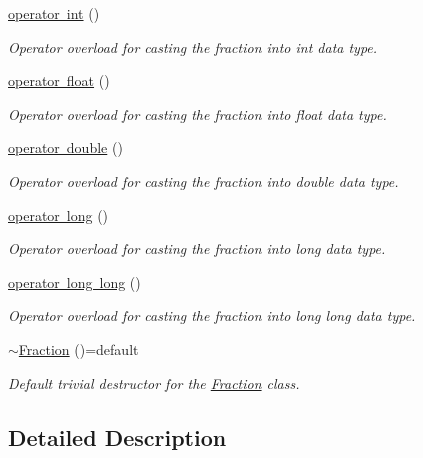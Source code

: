 \begin{DoxyCompactItemize}
\mbox{\hyperlink{class_fraction_a26e703ee017465f51b0327a51936dc81}{operator int}} ()
\begin{DoxyCompactList}\small\item\em Operator overload for casting the fraction into int data type. \end{DoxyCompactList}\item 
\mbox{\hyperlink{class_fraction_a8bdec9c82794a4f0ccaab7f8ba0a29b7}{operator float}} ()
\begin{DoxyCompactList}\small\item\em Operator overload for casting the fraction into float data type. \end{DoxyCompactList}\item 
\mbox{\hyperlink{class_fraction_ae5eacb8f904e3f988413b2a6985fe500}{operator double}} ()
\begin{DoxyCompactList}\small\item\em Operator overload for casting the fraction into double data type. \end{DoxyCompactList}\item 
\mbox{\hyperlink{class_fraction_ae0f4610e5b81f7a1cd2e1c28aa239388}{operator long}} ()
\begin{DoxyCompactList}\small\item\em Operator overload for casting the fraction into long data type. \end{DoxyCompactList}\item 
\mbox{\hyperlink{class_fraction_acd3b6a968bac3ef1cebbc64536be3a41}{operator long long}} ()
\begin{DoxyCompactList}\small\item\em Operator overload for casting the fraction into long long data type. \end{DoxyCompactList}\item 
\mbox{\label{class_fraction_ae8c95b1af65ddc54b41b72118ebe05ec}} 
\mbox{\hyperlink{class_fraction_ae8c95b1af65ddc54b41b72118ebe05ec}{$\sim$\+Fraction}} ()=default
\begin{DoxyCompactList}\small\item\em Default trivial destructor for the \mbox{\hyperlink{class_fraction}{Fraction}} class. \end{DoxyCompactList}\end{DoxyCompactItemize}


\subsection{Detailed Description}
